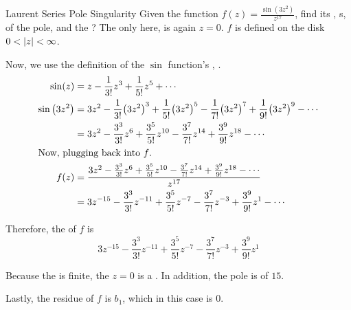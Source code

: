 \begin{example}{Laurent Series Pole Singularity}
  Given the function $f(z) = \frac{\sin \left( 3 z^{2} \right)}{z^{17}}$, find its , s,  of the pole, and the ?
  \tcblower{}
  The only  here, is again $z=0$.
  $f$ is defined on the  disk $0 < \left\lvert z \right\rvert < \infty$.

  Now, we use the definition of the $\sin$ function's , .
  \begin{align*}
    \sin(z) &= z - \frac{1}{3!} z^{3} + \frac{1}{5!} z^{5} + \cdots \\
    \sin \left( 3z^{2} \right) &= 3z^{2} - \frac{1}{3!} { \left( 3z^{2} \right)}^{3} + \frac{1}{5!} {\left( 3z^{2} \right)}^{5} - \frac{1}{7!} { \left( 3z^{2} \right)}^{7} + \frac{1}{9!} { \left( 3z^{2} \right)}^{9} - \cdots \\
            &= 3z^{2} - \frac{3^{3}}{3!} z^{6} + \frac{3^{5}}{5!} z^{10} - \frac{3^{7}}{7!} z^{14} + \frac{3^{9}}{9!} z^{18} - \cdots \\
    \shortintertext{Now, plugging back into $f$.}
    f(z) &= \frac{3z^{2} - \frac{3^{3}}{3!} z^{6} + \frac{3^{5}}{5!} z^{10} - \frac{3^{7}}{7!} z^{14} + \frac{3^{9}}{9!} z^{18} - \cdots}{z^{17}} \\
            &= 3z^{-15} - \frac{3^{3}}{3!} z^{-11} + \frac{3^{5}}{5!} z^{-7} - \frac{3^{7}}{7!} z^{-3} + \frac{3^{9}}{9!} z^{1} - \cdots
  \end{align*}

  Therefore, the  of $f$ is
  \begin{equation*}
    3z^{-15} - \frac{3^{3}}{3!} z^{-11} + \frac{3^{5}}{5!} z^{-7} - \frac{3^{7}}{7!} z^{-3} + \frac{3^{9}}{9!} z^{1}
  \end{equation*}

  Because the  is finite, the  $z=0$ is a .
  In addition, the pole is of  $15$.

  Lastly, the residue of $f$ is
  $b_{1}$, which in this case is $0$.
\end{example}


